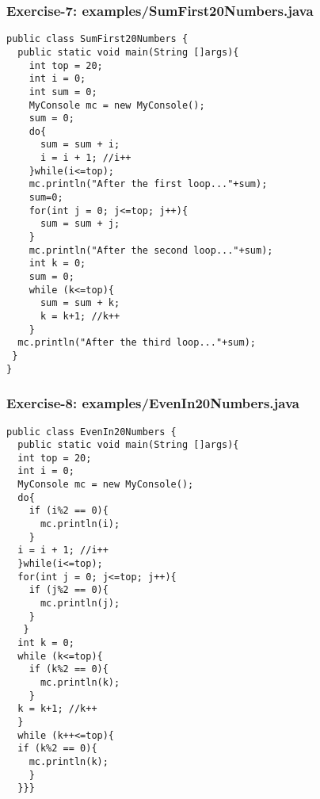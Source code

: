 \documentclass[xcolor=dvipsnames,dvip,notes=show,handout,table]{beamer}
\begin{document}


\begin{frame}[fragile]
\frametitle{Exercise-7: examples/SumFirst20Numbers.java}
\tiny
\begin{lstlisting}
public class SumFirst20Numbers {
  public static void main(String []args){
    int top = 20;
    int i = 0;
    int sum = 0;
    MyConsole mc = new MyConsole();
    sum = 0;
    do{
      sum = sum + i;
      i = i + 1; //i++
    }while(i<=top);		
    mc.println("After the first loop..."+sum);
    sum=0;
    for(int j = 0; j<=top; j++){
      sum = sum + j;
    }
    mc.println("After the second loop..."+sum);
    int k = 0;
    sum = 0;
    while (k<=top){
      sum = sum + k;
      k = k+1; //k++
    }
  mc.println("After the third loop..."+sum);
 }
}
\end{lstlisting}
\end{frame}




\begin{frame}[fragile]
\frametitle{Exercise-8: examples/EvenIn20Numbers.java}
\tiny
\begin{lstlisting}
public class EvenIn20Numbers {
  public static void main(String []args){
  int top = 20;
  int i = 0;
  MyConsole mc = new MyConsole();
  do{
    if (i%2 == 0){
      mc.println(i);
    }
  i = i + 1; //i++
  }while(i<=top);		
  for(int j = 0; j<=top; j++){
    if (j%2 == 0){
      mc.println(j);
    }
   }
  int k = 0;
  while (k<=top){
    if (k%2 == 0){
      mc.println(k);
    }
  k = k+1; //k++
  }
  while (k++<=top){
  if (k%2 == 0){
    mc.println(k);
    }
  }}}
\end{lstlisting}
\end{frame}



\end{document}

